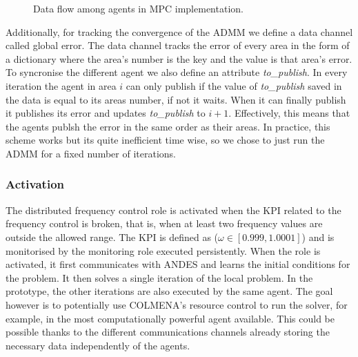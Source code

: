 \documentclass{article}
\begin{document}
\begin{figure}[ht]
\centering
{}
\caption{Data flow among agents in MPC implementation.}
\label{fig:mpc_agents}
\end{figure}

Additionally, for tracking the convergence of the ADMM we define a data channel called global error. The data channel tracks the error of every area in the form of a dictionary where the area's number is the key and the value is that area's error. To syncronise the different agent we also define an attribute \textit{to\_publish}. In every iteration the agent in area $i$ can only publish if the value of \textit{to\_publish} saved in the data is equal to its areas number, if not it waits. When it can finally publish it publishes its error and updates  \textit{to\_publish} to $i+1$. Effectively, this means that the agents publsh the error in the same order as their areas. In practice, this scheme works but its quite inefficient time wise, so we chose to just run the ADMM for a fixed number of iterations. 

\subsubsection*{Activation}

The distributed frequency control role is activated when the KPI related to the frequency control is broken, that is, when at least two frequency values are outside the allowed range. The KPI is defined as ($\omega \in [0.999, 1.0001]$) and is monitorised by the monitoring role executed persistently. When the role is activated, it first communicates with ANDES and learns the initial conditions for the problem. It then solves a single iteration of the local problem. In the prototype, the other iterations are also executed by the same agent. The goal however is to potentially use COLMENA's resource control to run the solver, for example, in the most computationally powerful agent available. This could be possible thanks to the different communications channels already storing the necessary data independently of the agents.
\end{document}
